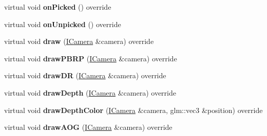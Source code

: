 \begin{DoxyCompactItemize}
\item 
virtual void {\bfseries on\+Picked} () override\hypertarget{classflw_1_1flf_1_1Entity_ac5ac6008e71514da1a33784ad5720ffd}{}\label{classflw_1_1flf_1_1Entity_ac5ac6008e71514da1a33784ad5720ffd}

\item 
virtual void {\bfseries on\+Unpicked} () override\hypertarget{classflw_1_1flf_1_1Entity_aff51141b0c24382055de2eb39b289627}{}\label{classflw_1_1flf_1_1Entity_aff51141b0c24382055de2eb39b289627}

\item 
virtual void {\bfseries draw} (\hyperlink{classflw_1_1flf_1_1ICamera}{I\+Camera} \&camera) override\hypertarget{classflw_1_1flf_1_1Entity_aee49157914b8dc708b4c42bd4ad07073}{}\label{classflw_1_1flf_1_1Entity_aee49157914b8dc708b4c42bd4ad07073}

\item 
virtual void {\bfseries draw\+P\+B\+RP} (\hyperlink{classflw_1_1flf_1_1ICamera}{I\+Camera} \&camera) override\hypertarget{classflw_1_1flf_1_1Entity_a9f77adfda64f405f9975299f4ff75c52}{}\label{classflw_1_1flf_1_1Entity_a9f77adfda64f405f9975299f4ff75c52}

\item 
virtual void {\bfseries draw\+DR} (\hyperlink{classflw_1_1flf_1_1ICamera}{I\+Camera} \&camera) override\hypertarget{classflw_1_1flf_1_1Entity_a83776205205468756486576ee677a31f}{}\label{classflw_1_1flf_1_1Entity_a83776205205468756486576ee677a31f}

\item 
virtual void {\bfseries draw\+Depth} (\hyperlink{classflw_1_1flf_1_1ICamera}{I\+Camera} \&camera) override\hypertarget{classflw_1_1flf_1_1Entity_a62a7675c097053e9906caec2d11d9cb3}{}\label{classflw_1_1flf_1_1Entity_a62a7675c097053e9906caec2d11d9cb3}

\item 
virtual void {\bfseries draw\+Depth\+Color} (\hyperlink{classflw_1_1flf_1_1ICamera}{I\+Camera} \&camera, glm\+::vec3 \&position) override\hypertarget{classflw_1_1flf_1_1Entity_afe8c6cefefc76104ab9b0a5ed80c7443}{}\label{classflw_1_1flf_1_1Entity_afe8c6cefefc76104ab9b0a5ed80c7443}

\item 
virtual void {\bfseries draw\+A\+OG} (\hyperlink{classflw_1_1flf_1_1ICamera}{I\+Camera} \&camera) override\hypertarget{classflw_1_1flf_1_1Entity_aa32e27988fd0434f9b6a2dff1f90335c}{}\label{classflw_1_1flf_1_1Entity_aa32e27988fd0434f9b6a2dff1f90335c}


\end{DoxyCompactItemize}
